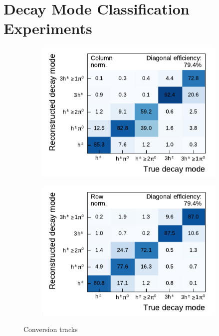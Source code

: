 \clearpage
\section{Decay Mode Classification Experiments}
\label{sec:app_decay_mode_exp}
\begin{figure}[htb]
  \begin{subfigure}[t]{0.48\textwidth}
    \centering
    \includegraphics{./figures/decay_mode_classification/experiments/mig_mat_conversions.pdf}
  \end{subfigure}\hfill
  \begin{subfigure}[t]{0.48\textwidth}
    \centering
    \includegraphics{./figures/decay_mode_classification/experiments/comp_mat_conversions.pdf}
  \end{subfigure}
  \caption{Conversion tracks}
\end{figure}

